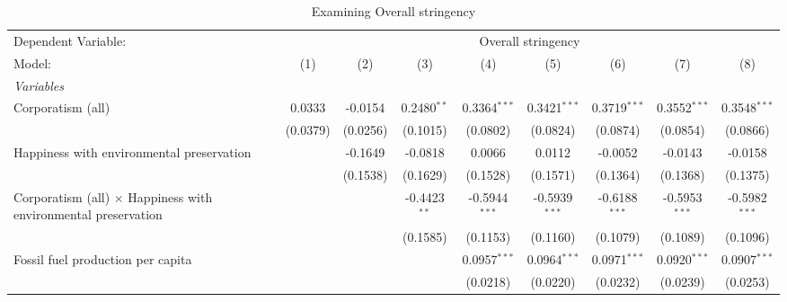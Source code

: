 
\begin{table}[htbp]
   \caption{Examining Overall stringency}
   \centering
   \begin{tabular}{lcccccccc}
      \tabularnewline \midrule \midrule
      Dependent Variable: & \multicolumn{8}{c}{Overall stringency}\\
      Model:                                                                & (1)      & (2)      & (3)            & (4)             & (5)             & (6)             & (7)                   & (8)\\  
      \midrule
      \emph{Variables}\\
      Corporatism (all)                                                     & 0.0333   & -0.0154  & 0.2480$^{**}$  & 0.3364$^{***}$  & 0.3421$^{***}$  & 0.3719$^{***}$  & 0.3552$^{***}$        & 0.3548$^{***}$\\   
                                                                            & (0.0379) & (0.0256) & (0.1015)       & (0.0802)        & (0.0824)        & (0.0874)        & (0.0854)              & (0.0866)\\   
      Happiness with environmental preservation                             &          & -0.1649  & -0.0818        & 0.0066          & 0.0112          & -0.0052         & -0.0143               & -0.0158\\   
                                                                            &          & (0.1538) & (0.1629)       & (0.1528)        & (0.1571)        & (0.1364)        & (0.1368)              & (0.1375)\\   
      Corporatism (all) $\times$ Happiness with environmental preservation  &          &          & -0.4423$^{**}$ & -0.5944$^{***}$ & -0.5939$^{***}$ & -0.6188$^{***}$ & -0.5953$^{***}$       & -0.5982$^{***}$\\   
                                                                            &          &          & (0.1585)       & (0.1153)        & (0.1160)        & (0.1079)        & (0.1089)              & (0.1096)\\   
      Fossil fuel production per capita                                     &          &          &                & 0.0957$^{***}$  & 0.0964$^{***}$  & 0.0971$^{***}$  & 0.0920$^{***}$        & 0.0907$^{***}$\\   
                                                                            &          &          &                & (0.0218)        & (0.0220)        & (0.0232)        & (0.0239)              & (0.0253)\\   

\end{tabular}
\end{table}
